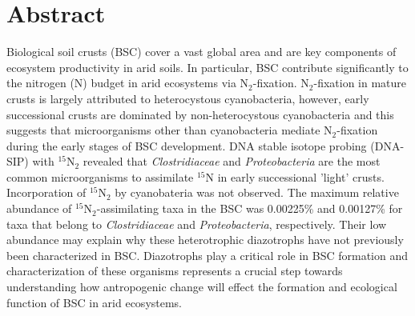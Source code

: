 \section{Abstract}
Biological soil crusts (BSC) cover a vast global area and are key components of
ecosystem productivity in arid soils. In particular, BSC contribute
significantly to the nitrogen (N) budget in arid ecosystems via N$_{2}$-fixation.
N$_{2}$-fixation in mature crusts is largely attributed to heterocystous
cyanobacteria, however, early successional crusts are dominated by
non-heterocystous cyanobacteria and this suggests that microorganisms other
than cyanobacteria mediate N$_{2}$-fixation during the early stages of BSC
development. DNA stable isotope probing (DNA-SIP) with $^{15}$N$_{2}$ revealed
that \textit{Clostridiaceae} and \textit{Proteobacteria} are the most common
microorganisms to assimilate $^{15}$N in early successional 'light' crusts.
Incorporation of $^{15}$N$_{2}$ by cyanobateria was not observed. The maximum
relative abundance of $^{15}$N$_{2}$-assimilating taxa in the BSC was 0.00225\%
and 0.00127\% for taxa that belong to \textit{Clostridiaceae} and
\textit{Proteobacteria}, respectively. Their low abundance may
explain why these heterotrophic diazotrophs have not previously been
characterized in BSC.  Diazotrophs play a critical role in BSC formation and
characterization of these organisms represents a crucial step towards
understanding how antropogenic change will effect the formation and ecological
function of BSC in arid ecosystems.


